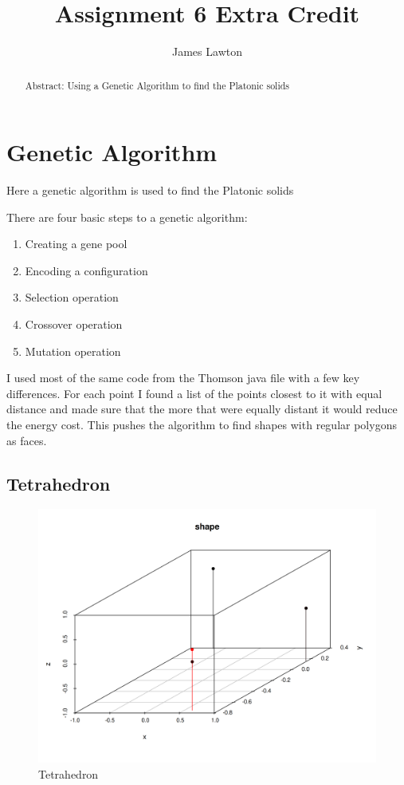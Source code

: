 \documentclass[prb,twocolumn]{revtex4-2}
\begin{document}
\title{Assignment 6 Extra Credit}

\author{James Lawton}


\begin{abstract}
Abstract: Using a Genetic Algorithm to find the Platonic solids
\end{abstract}

\maketitle

\section{Genetic Algorithm}

\noindent

Here a genetic algorithm is used to find the Platonic solids

There are four basic steps to a genetic algorithm:

\begin{enumerate}
    \item Creating a gene pool
    \item Encoding a configuration
    \item Selection operation
    \item Crossover operation
    \item Mutation operation
\end{enumerate}

I used most of the same code from the Thomson java file with a few key 
differences. For each point I found a list of the points closest to it with 
equal distance and made sure that the more that were equally distant it would
reduce the energy cost. This pushes the algorithm to find shapes with regular 
polygons as faces.

\subsection{Tetrahedron}
\begin{figure}[H]
    \centerline{\includegraphics [width=3 in] {img/tetra.png}}
    \caption{Tetrahedron} \label{q1}
\end{figure}
\end{document}
